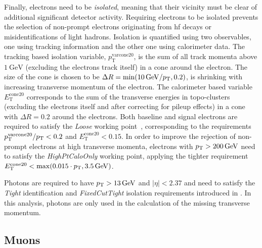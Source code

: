 Finally, electrons need to be \textit{isolated}, meaning that their vicinity must be clear of additional significant detector activity. Requiring electrons to be isolated prevents the selection of non-prompt electrons originating from \eg \gls{hf} decays or misidentifications of light hadrons. Isolation is quantified using two observables, one using tracking information and the other one using calorimeter data. The tracking based isolation variable, $p_{\mathrm{T}}^{\mathrm{varcone20}}$, is the sum of all track momenta above $\SI{1}{\GeV}$ (excluding the electrons track itself) in a cone around the electron. The size of the cone is chosen to be $\Delta R = \min (\SI{10}{\GeV}/\pt,0.2)$, \ie is shrinking with increasing transverse momentum of the electron. The calorimeter based variable $E_{\mathrm{T}}^{\mathrm{cone20}}$ corresponds to the sum of the transverse energies in topo-clusters (excluding the electrons itself and after correcting for pileup effects) in a cone with $\Delta R = 0.2$ around the electrons. Both baseline and signal electrons are required to satisfy the \textit{Loose} working point~\cite{EGAM-2018-01}, corresponding to the requirements $p_{\mathrm{T}}^{\mathrm{varcone20}}/p_{\textrm{T}} < 0.2$ and $E_{\mathrm{T}}^{\mathrm{cone20}} < 0.15$. In order to improve the rejection of non-prompt electrons at high transverse momenta, electrons with $\pt >\SI{200}{\GeV}$ need to satisfy the \textit{HighPtCaloOnly} working point, applying the tighter requirement $E_{\mathrm{T}}^{\mathrm{cone20}} < \max (0.015\cdot\pt,\SI{3.5}{\GeV})$. 

Photons are required to have $p_{\textrm{T}} > \SI{13}{GeV}$ and $\vert\eta\vert<2.37$ and need to satisfy the \textit{Tight} identification and \textit{FixedCutTight} isolation requirements introduced in \cite{EGAM-2018-01}. In this analysis, photons are only used in the calculation of the missing transverse momentum.

\subsection{Muons}

